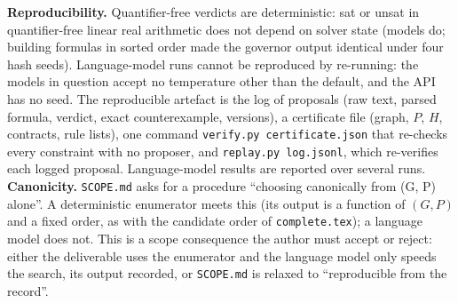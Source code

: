 \documentclass[10pt]{article}
\theoremstyle{tplain}\newtheorem{theorem}{Theorem}\newtheorem{lemma}[theorem]{Lemma}\newtheorem{proposition}[theorem]{Proposition}\newtheorem{corollary}[theorem]{Corollary}\newtheorem{claim}[theorem]{Claim}
\theoremstyle{tdef}\newtheorem{definition}[theorem]{Definition}
\begin{document}
\textbf{Reproducibility.} Quantifier-free verdicts are deterministic: sat or unsat in quantifier-free linear real arithmetic does not depend on solver state (models do; building formulas in sorted order made the governor output identical under four hash seeds). Language-model runs cannot be reproduced by re-running: the models in question accept no temperature other than the default, and the API has no seed. The reproducible artefact is the log of proposals (raw text, parsed formula, verdict, exact counterexample, versions), a certificate file (graph, $P$, $H$, contracts, rule lists), one command \texttt{verify.py certificate.json} that re-checks every constraint with no proposer, and \texttt{replay.py log.jsonl}, which re-verifies each logged proposal. Language-model results are reported over several runs. \textbf{Canonicity.} \texttt{SCOPE.md} asks for a procedure ``choosing canonically from (G, P) alone''. A deterministic enumerator meets this (its output is a function of $(G,P)$ and a fixed order, as with the candidate order of \texttt{complete.tex}); a language model does not. This is a scope consequence the author must accept or reject: either the deliverable uses the enumerator and the language model only speeds the search, its output recorded, or \texttt{SCOPE.md} is relaxed to ``reproducible from the record''.
\end{document}

